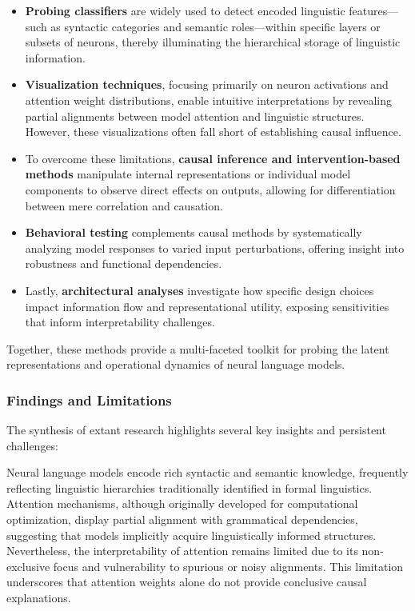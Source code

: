 \begin{itemize}
  \item \textbf{Probing classifiers} are widely used to detect encoded linguistic features—such as syntactic categories and semantic roles—within specific layers or subsets of neurons, thereby illuminating the hierarchical storage of linguistic information.
  \item \textbf{Visualization techniques}, focusing primarily on neuron activations and attention weight distributions, enable intuitive interpretations by revealing partial alignments between model attention and linguistic structures. However, these visualizations often fall short of establishing causal influence.
  \item To overcome these limitations, \textbf{causal inference and intervention-based methods} manipulate internal representations or individual model components to observe direct effects on outputs, allowing for differentiation between mere correlation and causation.
  \item \textbf{Behavioral testing} complements causal methods by systematically analyzing model responses to varied input perturbations, offering insight into robustness and functional dependencies.
  \item Lastly, \textbf{architectural analyses} investigate how specific design choices impact information flow and representational utility, exposing sensitivities that inform interpretability challenges.
\end{itemize}

Together, these methods provide a multi-faceted toolkit for probing the latent representations and operational dynamics of neural language models.

\subsubsection{Findings and Limitations}

The synthesis of extant research highlights several key insights and persistent challenges:

Neural language models encode rich syntactic and semantic knowledge, frequently reflecting linguistic hierarchies traditionally identified in formal linguistics. Attention mechanisms, although originally developed for computational optimization, display partial alignment with grammatical dependencies, suggesting that models implicitly acquire linguistically informed structures. Nevertheless, the interpretability of attention remains limited due to its non-exclusive focus and vulnerability to spurious or noisy alignments. This limitation underscores that attention weights alone do not provide conclusive causal explanations.

